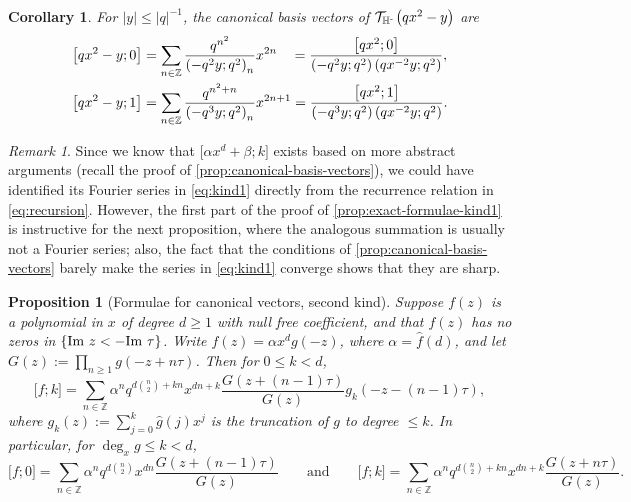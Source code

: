\documentclass[reqno,11pt]{amsart}
\newtheorem{proposition}[theorem]{Proposition}
\newtheorem{corollary}[theorem]{Corollary}
\theoremstyle{definition}
\theoremstyle{remark}
\newtheorem*{remark}{Remark}
\numberwithin{equation}{section}
\newcommand{\Z}{\mathbb{Z}}
\newcommand{\Hminus}{{\mathbb{H}^{\textnormal{-}\hspace{-0.03cm}}}}
\newcommand{\mT}{\mathcal{T}}
\renewcommand{\Im}{\textnormal{Im}\ }
\newcommand{\vect}[2]{\big[{#1};{#2}\big]}
\renewcommand{\hat}{\widehat}
\begin{document}
\begin{corollary} \label{cor:kind1}
For $|y| \le |q|^{-1}$, the canonical basis vectors of $\mT_\Hminus\left(qx^2 - y\right)$ are
\[
\begin{aligned}
    \vect{qx^2 - y}{0} 
    &= \sum_{n \in \Z} \frac{q^{n^2}}{\left(-q^2y; q^2\right)_n} x^{2n}
    \ \ \hspace{0.11cm} =
    \frac{\vect{qx^2}{0}}{\left(-q^2y; q^2\right)\left(qx^{-2}y; q^2\right)}, 
    \\
    \vect{qx^2 - y}{1} 
    &= \sum_{n \in \Z} \frac{q^{n^2+n}}{\left(-q^3y; q^2\right)_n} x^{2n+1}
    =
    \frac{\vect{qx^2}{1}}{\left(-q^3y; q^2\right)\left(qx^{-2}y; q^2\right)}.
\end{aligned}
\]
\end{corollary}

\begin{remark}
Since we know that $\vect{\alpha x^d + \beta}{k}$ exists based on more abstract arguments (recall the proof of \cref{prop:canonical-basis-vectors}), we could have identified its Fourier series in \cref{eq:kind1} directly from the recurrence relation in \cref{eq:recursion}. However, the first part of the proof of \cref{prop:exact-formulae-kind1} is instructive for the next proposition, where the analogous summation is usually not a Fourier series; also, the fact that the conditions of \cref{prop:canonical-basis-vectors} barely make the series in \cref{eq:kind1} converge shows that they are sharp.
\end{remark}
\begin{proposition}[Formulae for canonical vectors, second kind] \label{prop:exact-formulae-kind2}
Suppose $f(z)$ is a polynomial in $x$ of degree $d \ge 1$ with null free coefficient, and that $f(z)$ has no zeros in $\{\Im z < - \Im \tau\}$. Write $f(z) = \alpha x^d g(-z)$, where $\alpha = \hat{f}(d)$, and let $G(z) := \prod_{n \ge 1} g(-z+n\tau)$. Then for $0 \le k < d$,
\begin{equation} \label{eq:kind2}
    \vect{f}{k}
    =
    \sum_{n \in \Z} \alpha^n q^{d\binom{n}{2} + kn} x^{dn+k} \frac{G\left(z+(n-1)\tau\right)}{G(z)} g_k\left(-z-(n-1)\tau\right),
\end{equation}
where $g_k(z) := \sum_{j=0}^k \hat{g}(j) x^{j}$ is the truncation of $g$ to degree $\le k$. In particular, for $\deg_x g \le k < d$,
\[
    \vect{f}{0} =
    \sum_{n \in \Z} \alpha^n q^{d\binom{n}{2}} x^{dn} \frac{G(z+(n-1)\tau)}{G(z)}
    \qquad 
    \text{and} 
    \qquad 
    \vect{f}{k} =
    \sum_{n \in \Z} \alpha^n q^{d\binom{n}{2} + kn} x^{dn+k} \frac{G(z+n\tau)}{G(z)}.
\]
\end{proposition}
\end{document}
